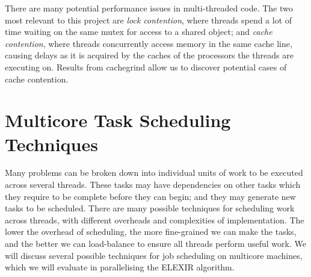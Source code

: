 There are many potential performance issues in multi-threaded code. The two most relevant to this project are \emph{lock contention}, where threads spend a lot of time waiting on the same mutex for access to a shared object; and \emph{cache contention}, where threads concurrently access memory in the same cache line, causing delays as it is acquired by the caches of the processors the threads are executing on. Results from cachegrind allow us to discover potential cases of cache contention.

\section{Multicore Task Scheduling Techniques} \label{sec:sched}

Many problems can be broken down into individual units of work to be executed across several threads\cite{bib:aomp}. These tasks may have dependencies on other tasks which they require to be complete before they can begin; and they may generate new tasks to be scheduled. There are many possible techniques for scheduling work across threads, with different overheads and complexities of implementation. The lower the overhead of scheduling, the more fine-grained we can make the tasks, and the better we can load-balance to ensure all threads perform useful work. We will discuss several possible techniques for job scheduling on multicore machines, which we will evaluate in parallelising the ELEXIR algorithm.

